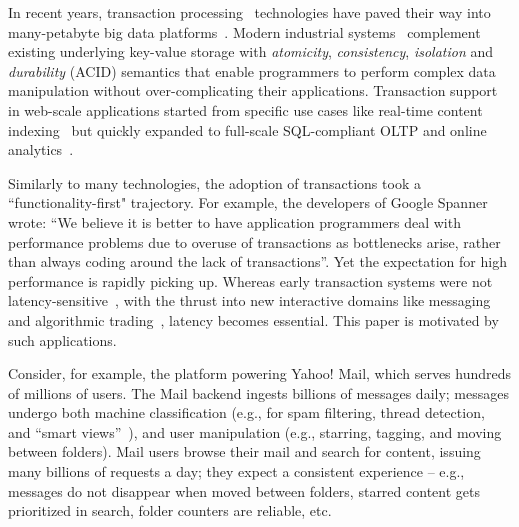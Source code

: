 In recent years, transaction processing~\cite{Gray:1992:TPC:573304} technologies have paved their way into many-petabyte big data 
platforms~\cite{Percolator2010,Spanner2012,Omid2017}. 
Modern industrial  systems~\cite{Percolator2010,Omid2017,tephra,cockroach} complement 
existing underlying key-value storage with {\em atomicity}, {\em consistency}, {\em isolation\/} and 
{\em durability} (ACID) semantics that enable programmers to perform 
complex data manipulation without over-complicating their applications. Transaction support 
in web-scale applications started from specific use cases like real-time content indexing~\cite{Percolator2010,
Omid2017} but quickly expanded to full-scale SQL-compliant OLTP and online analytics~\cite{Phoenix, F1-2013}.

Similarly to many technologies, the adoption of transactions took a  ``functionality-first" trajectory. 
For example, the developers of Google Spanner~\cite{Spanner2012} wrote: ``We believe it
is better to have application programmers deal with performance problems due to overuse 
of transactions as bottlenecks arise, rather than always coding around the lack of transactions''. 
Yet the expectation for high performance is rapidly picking up. %
Whereas early transaction systems were not latency-sensitive~\cite{Percolator2010, Omid2017}, 
with the thrust into new interactive domains like messaging~\cite{Borthakur:2011} and algorithmic 
trading~\cite{opentsdb}, latency becomes essential. This paper is motivated by such  applications.

Consider, for example, the platform powering Yahoo! Mail, which serves hundreds of millions of users. 
The Mail backend ingests billions of messages daily; messages undergo both machine 
classification (e.g., for spam filtering, thread detection, and ``smart views''~\cite{smart-view}),
and user manipulation (e.g., starring, tagging, and moving between folders).    
Mail users browse their mail and search for content, issuing many billions of requests a day; they
expect a consistent experience -- e.g., messages  do not 
disappear when moved between folders, starred content gets prioritized in search, folder counters are reliable, etc.


